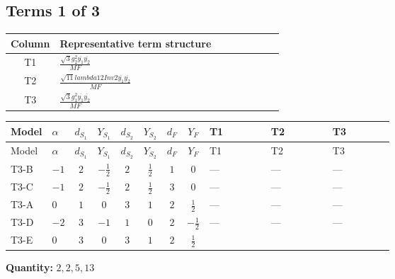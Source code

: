 \documentclass[8pt]{article}
\begin{document}
\begin{landscape}
\subsection*{Terms 1 of 3}
\begin{center}
\begin{tabular}{@{}c >{\raggedright\arraybackslash}p{0.82\linewidth}@{}}
\toprule
Column & Representative term structure \\
\midrule
T1 & \(\displaystyle \frac{\sqrt{3} g_{2}^{2} \overline{y_{1}} \overline{y_{2}}}{MF}\) \\
\midrule
T2 & \(\displaystyle \frac{\sqrt{11} lambda12Inv2 \overline{y_{1}} \overline{y_{2}}}{MF}\) \\
\midrule
T3 & \(\displaystyle \frac{\sqrt{3} g_{1}^{2} \overline{y_{1}} \overline{y_{2}}}{MF}\) \\
\midrule
\bottomrule
\end{tabular}
\end{center}
\smallskip
\tiny
\begin{longtable}{@{}llcccccc >{\raggedright\arraybackslash}p{0.21\linewidth} >{\raggedright\arraybackslash}p{0.21\linewidth} >{\raggedright\arraybackslash}p{0.21\linewidth}@{}}
\toprule
Model & $\alpha$ & $d_{S_1}$ & $Y_{S_1}$ & $d_{S_2}$ & $Y_{S_2}$ & $d_F$ & $Y_F$ & T1 & T2 & T3 \\
\midrule
\endfirsthead
\toprule
Model & $\alpha$ & $d_{S_1}$ & $Y_{S_1}$ & $d_{S_2}$ & $Y_{S_2}$ & $d_F$ & $Y_F$ & T1 & T2 & T3 \\
\midrule
\endhead
T3-B & $-1$ & $2$ & $-\frac{1}{2}$ & $2$ & $\frac{1}{2}$ & $1$ & $0$ & --- & --- & --- \\
\midrule
T3-C & $-1$ & $2$ & $-\frac{1}{2}$ & $2$ & $\frac{1}{2}$ & $3$ & $0$ & --- & --- & --- \\
\midrule
T3-A & $0$ & $1$ & $0$ & $3$ & $1$ & $2$ & $\frac{1}{2}$ & --- & --- & --- \\
\midrule
T3-D & $-2$ & $3$ & $-1$ & $1$ & $0$ & $2$ & $-\frac{1}{2}$ & --- & --- & --- \\
\midrule
T3-E & $0$ & $3$ & $0$ & $3$ & $1$ & $2$ & $\frac{1}{2}$ & \scriptsize\adjustbox{max width=\linewidth}{$\begin{gathered} - \frac{49 \sqrt{3} g_{2}^{2} \overline{y_{1}} \overline{y_{2}}}{24 MF}\end{gathered}$} & \scriptsize\adjustbox{max width=\linewidth}{$\begin{gathered} - \frac{3 \sqrt{11} lambda12Inv2 \overline{y_{1}} \overline{y_{2}}}{22 MF}\end{gathered}$} & \scriptsize\adjustbox{max width=\linewidth}{$\begin{gathered} - \frac{\sqrt{3} g_{1}^{2} \overline{y_{1}} \overline{y_{2}}}{8 MF}\end{gathered}$} \\
\midrule
\bottomrule
\end{longtable}
\clearpage
\noindent\textbf{Quantity: }$\mathrm{2,2,5,13}$\par\smallskip

\end{landscape}
\end{document}
